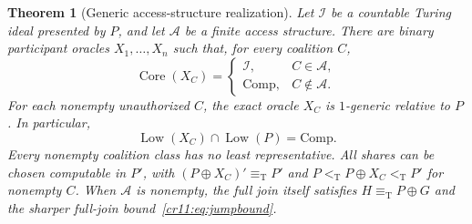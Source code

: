 \documentclass[11pt,letterpaper]{article}
\theoremstyle{plain}
\newtheorem{theorem}{Theorem}[section]
\theoremstyle{definition}
\theoremstyle{remark}
\numberwithin{equation}{section}
\newcommand{\ltT}{<_{\mathrm T}}
\newcommand{\eqT}{\equiv_{\mathrm T}}
\newcommand{\Core}{\operatorname{Core}}
\newcommand{\Low}{\operatorname{Low}}
\newcommand{\Comp}{\mathrm{Comp}}
\newcommand{\join}{\mathbin{\oplus}}
\newcommand{\I}{\mathcal I}
\newcommand{\Acal}{\mathcal A}
\begin{document}
\begin{theorem}[Generic access-structure realization]\label{cr11:thm:access}
Let $\I$ be a countable Turing ideal presented by $P$, and let $\Acal$ be a
finite access structure. There are binary participant oracles $X_1,\ldots,X_n$
such that, for every coalition $C$,
\begin{equation}\label{cr11:eq:access}
 \Core(X_C)=
 \begin{cases}
 \I,&C\in\Acal,\\
 \Comp,&C\notin\Acal.
 \end{cases}
\end{equation}
For each nonempty unauthorized $C$, the exact oracle $X_C$ is $1$-generic
relative to $P$. In particular,
\begin{equation}\label{cr11:eq:exactsecrecy}
                  \Low(X_C)\cap\Low(P)=\Comp.
\end{equation}
Every nonempty coalition class has no least representative. All shares can
be chosen computable in $P'$, with
$(P\join X_C)'\eqT P'$ and $P\ltT P\join X_C\ltT P'$ for nonempty $C$.
When $\Acal$ is nonempty, the full join itself satisfies
$H\eqT P\join G$ and the sharper full-join bound~\eqref{cr11:eq:jumpbound}.
\end{theorem}
\end{document}
